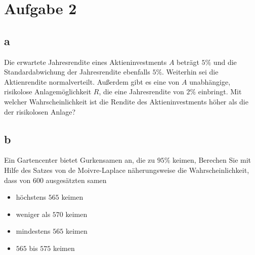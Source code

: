 \section{Aufgabe 2}

\subsection{a}

Die erwartete Jahresrendite eines Aktieninvestments $A$ beträgt $5\%$ und die
Standardabwichung der Jahresrendite ebenfalls $5\%$. Weiterhin sei die
Aktienrendite normalverteilt. Außerdem gibt es eine von $A$ unabhängige,
risikolose Anlagemöglichkeit $R$, die eine Jahresrendite von $2\%$ einbringt.
Mit welcher Wahrscheinlichkeit ist die Rendite des Aktieninvestments höher als
die der risikolosen Anlage?

\subsection{b}

Ein Gartencenter bietet Gurkensamen an, die zu $95\%$ keimen, Berechen Sie mit
Hilfe des Satzes von de Moivre-Laplace näherungsweise die Wahrscheinlichkeit,
dass von 600 ausgesätzten samen

\begin{itemize}
    \item höchstens $565$ keimen
    \item weniger als $570$ keimen
    \item mindestens $565$ keimen
    \item $565$ bis $575$ keimen
\end{itemize}